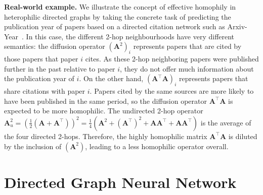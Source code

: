\documentclass{article}
\newcommand\ours{Directed Graph Neural Network}
\theoremstyle{plain}
\theoremstyle{definition}
\theoremstyle{remark}
\begin{document}
\textbf{Real-world example.} We illustrate the concept of effective homophily in heterophilic directed graphs by taking the concrete task of predicting the publication year of papers based on a directed citation network such as Arxiv-Year~\cite{lim2021large}. 
In this case, the different 2-hop neighbourhoods have very different semantics: the diffusion operator $(\mathbf{A}^2)_i$ represents papers that are cited by those papers that paper $i$ cites. As these 2-hop neighboring papers were published further in the past relative to paper $i$, they do not offer much information about the publication year of $i$.
On the other hand, $(\mathbf{A}^\top \mathbf{A})_i$ represents papers that share citations with paper $i$. Papers cited by the same sources are more likely to have been published in the same period, so the diffusion operator $\mathbf{A}^\top \mathbf{A}$ is expected to be more homophilic.
The undirected 2-hop operator $\mathbf{A}_u^2 = (\frac{1}{2} (\mathbf{A} + \mathbf{A}^\top))^ 2 = \frac{1}{4} (\mathbf{A}^2 + (\mathbf{A}^\top)^2 + \mathbf{A}\mathbf{A}^\top + \mathbf{A} \mathbf{A}^\top)$ is the average of the four directed 2-hops. Therefore, the highly homophilic matrix $\mathbf{A}^\top \mathbf{A}$ is diluted by the inclusion of $(\mathbf{A}^2)$, leading to a less homophilic operator overall.




 \section{\ours{}}
\label{sec:method}
\end{document}
